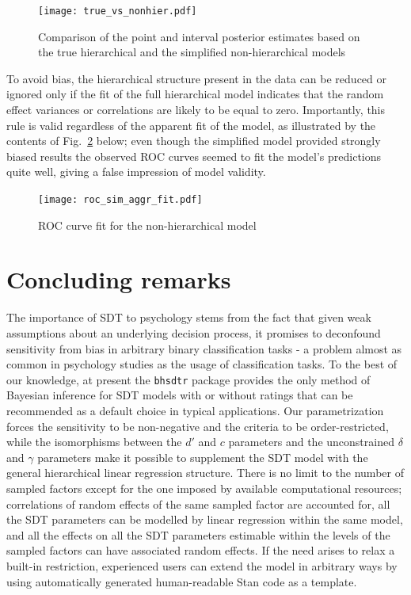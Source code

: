 \documentclass[a4paper,man,apacite,floatsintext]{apa6}
\newcommand{\code}[1]{\texttt{#1}}
\begin{document}
\begin{figure}[H]
  \centering
  \texttt{[image: true\_vs\_nonhier.pdf]}
  \caption{Comparison of the point and interval posterior estimates
    based on the true hierarchical and the simplified non-hierarchical
    models}
  \label{fig:5}
\end{figure}

To avoid bias, the hierarchical structure present in the data can be
reduced or ignored only if the fit of the full hierarchical model
indicates that the random effect variances or correlations are likely
to be equal to zero. Importantly, this rule is valid regardless of the
apparent fit of the model, as illustrated by the contents of
Fig.~\ref{fig:8} below; even though the simplified model provided
strongly biased results the observed ROC curves seemed to fit the
model's predictions quite well, giving a false impression of model
validity.

\begin{figure}[H]
  \centering
  \texttt{[image: roc\_sim\_aggr\_fit.pdf]}
  \caption{ROC curve fit for the non-hierarchical model}
  \label{fig:8}
\end{figure}

\section{Concluding remarks}

The importance of SDT to psychology stems from the fact that given
weak assumptions about an underlying decision process, it promises to
deconfound sensitivity from bias in arbitrary binary classification
tasks - a problem almost as common in psychology studies as the usage
of classification tasks. To the best of our knowledge, at present the
\code{bhsdtr} package provides the only method of Bayesian inference
for SDT models with or without ratings that can be recommended as a
default choice in typical applications. Our parametrization forces the
sensitivity to be non-negative and the criteria to be
order-restricted, while the isomorphisms between the $d'$ and $c$
parameters and the unconstrained $\delta$ and $\gamma$ parameters make
it possible to supplement the SDT model with the general hierarchical
linear regression structure. There is no limit to the number of
sampled factors except for the one imposed by available computational
resources; correlations of random effects of the same sampled factor
are accounted for, all the SDT parameters can be modelled by linear
regression within the same model, and all the effects on all the SDT
parameters estimable within the levels of the sampled factors can have
associated random effects. If the need arises to relax a built-in
restriction, experienced users can extend the model in arbitrary ways
by using automatically generated human-readable Stan code as a
template.


\end{document}
